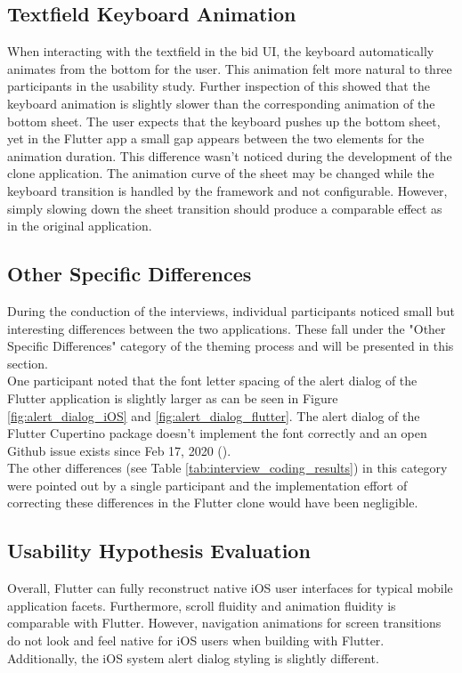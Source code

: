 \subsection{Textfield Keyboard Animation}
When interacting with the textfield in the bid UI, the keyboard automatically animates from the bottom for the user. This animation felt more natural to three participants in the usability study. 
Further inspection of this showed that the keyboard animation is slightly slower than the corresponding animation of the bottom sheet. The user expects that the keyboard pushes up the bottom sheet, yet in the
Flutter app a small gap appears between the two elements for the animation duration.
This difference wasn't noticed during the development of the clone application. The animation curve of the sheet may be changed while the keyboard transition is handled by the framework and not configurable. However, simply slowing
down the sheet transition should produce a comparable effect as in the original application.

\subsection{Other Specific Differences}
During the conduction of the interviews, individual participants noticed small but interesting differences between the two applications. These fall under the "Other Specific Differences" category of the 
theming process and will be presented in this section.\\
One participant noted that the font letter spacing of the alert dialog of the Flutter application is slightly larger as can be seen in Figure \ref{fig:alert_dialog_iOS} and \ref{fig:alert_dialog_flutter}. 
The alert dialog of the Flutter Cupertino package doesn't implement the font correctly and an open Github issue exists since Feb 17, 2020 (\cite{FlutterCommunity2020}).\\
The other differences (see Table \ref{tab:interview_coding_results}) in this category were pointed out by a single participant and the implementation effort of correcting these differences in the Flutter clone would have been negligible.

\subsection{Usability Hypothesis Evaluation}
Overall, Flutter can fully reconstruct native iOS user interfaces for typical mobile application facets. Furthermore, scroll fluidity and animation fluidity is comparable with Flutter.
However, navigation animations for screen transitions
do not look and feel native for iOS users when building with Flutter. Additionally, the iOS system alert dialog styling is slightly different.

